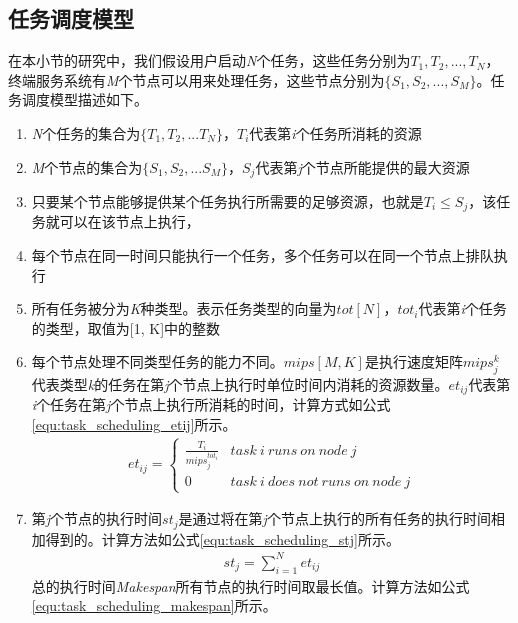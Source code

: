 \subsection{任务调度模型}
在本小节的研究中，我们假设用户启动\emph{N}个任务，这些任务分别为${T_1,T_2,...,T_N}$，终端服务系统有\emph{M}个节点可以用来处理任务，这些节点分别为$\{S_1,S_2,...,S_M\}$。任务调度模型描述如下。
\begin{enumerate}[]
    \item \emph{N}个任务的集合为$\{T_1,T_2,...T_N\}$，$T_i$代表第\emph{i}个任务所消耗的资源
    \item \emph{M}个节点的集合为$\{S_1,S_2,...S_M\}$，$S_j$代表第\emph{j}个节点所能提供的最大资源
    \item 只要某个节点能够提供某个任务执行所需要的足够资源，也就是$T_i \leq S_j$，该任务就可以在该节点上执行，
    \item 每个节点在同一时间只能执行一个任务，多个任务可以在同一个节点上排队执行
    \item 所有任务被分为\emph{K}种类型。表示任务类型的向量为$tot[N]$，$tot_i$代表第\emph{i}个任务的类型，取值为[1, K]中的整数
    \item 每个节点处理不同类型任务的能力不同。$mips[M,K]$是执行速度矩阵$mips_{j}^{k}$ 代表类型\emph{k}的任务在第\emph{j}个节点上执行时单位时间内消耗的资源数量。$et_{ij}$代表第\emph{i}个任务在第\emph{j}个节点上执行所消耗的时间，计算方式如公式\ref{equ:task_scheduling_etij}所示。
    \begin{eqnarray}\label{equ:task_scheduling_etij}
        et_{ij}= \begin{cases}
            \frac{T_i}{mips_{j}^{tot_i}} & task\  i\  runs\  on\  node\  j \\
            0&task\  i\  does\  not\  runs\  on\  node\  j 
            \end{cases} 
    \end{eqnarray}
    \item 第\emph{j}个节点的执行时间$st_j$是通过将在第\emph{j}个节点上执行的所有任务的执行时间相加得到的。计算方法如公式\ref{equ:task_scheduling_stj}所示。
    \begin{eqnarray}\label{equ:task_scheduling_stj}
        st_{j}=\sum_{i=1}^{N} et_{ij}
    \end{eqnarray}
    总的执行时间\emph{Makespan}所有节点的执行时间取最长值。计算方法如公式\ref{equ:task_scheduling_makespan}所示。

\end{enumerate}
